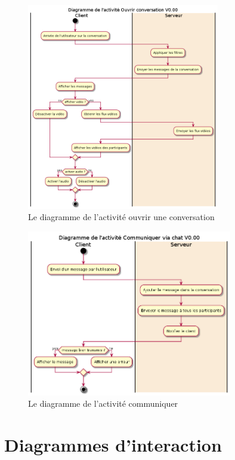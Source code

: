 \documentclass[11pt,dvipsnames,svgnames]{report}
\begin{document}
\begin{figure}[H]
\centerline{\includegraphics[width=0.75\textwidth]{diagrammes/activity-openConv-diag.png}}
\caption{Le diagramme de l'activité \og ouvrir une conversation \fg}
\end{figure}

\begin{figure}[H]
\centerline{\includegraphics[width=0.8\textwidth]{diagrammes/activity-sendMsg-diag.png}}
\caption{Le diagramme de l'activité \og communiquer \fg}
\end{figure}


\section{Diagrammes d’interaction}
\end{document}
